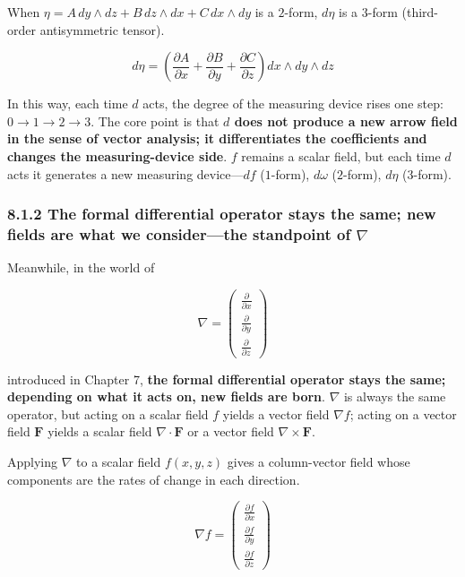\documentclass[a4paper,12pt,openany]{book}
\begin{document}
When \(\eta = A\,dy\wedge dz + B\,dz\wedge dx + C\,dx\wedge dy\) is a
\(2\)-form, \(d\eta\) is a \(3\)-form (third-order antisymmetric
tensor).

\[d\eta = \left(\frac{\partial A}{\partial x} + \frac{\partial B}{\partial y} + \frac{\partial C}{\partial z}\right) dx\wedge dy\wedge dz\]

In this way, each time \(d\) acts, the degree of the measuring device
rises one step: \(0\to1\to2\to3\). The core point is that
\textbf{$d$ does not produce a new arrow field in the sense of vector analysis; it differentiates the coefficients and changes the measuring-device side}.
\(f\) remains a scalar field, but each time \(d\) acts it generates a
new measuring device—\(df\) (\(1\)-form), \(d\omega\) (\(2\)-form),
\(d\eta\) (\(3\)-form).

\hypertarget{the-formal-differential-operator-stays-the-same-new-fields-are-what-we-considerthe-standpoint-of-nabla}{%
\subsubsection{\texorpdfstring{8.1.2 The formal differential operator
stays the same; new fields are what we consider—the standpoint of
\(\nabla\)}{8.1.2 The formal differential operator stays the same; new fields are what we consider—the standpoint of \textbackslash nabla}}\label{the-formal-differential-operator-stays-the-same-new-fields-are-what-we-considerthe-standpoint-of-nabla}}

Meanwhile, in the world of

\[
\nabla
=
\begin{pmatrix}
\frac{\partial}{\partial x}\\[0.3em]
\frac{\partial}{\partial y}\\[0.3em]
\frac{\partial}{\partial z}
\end{pmatrix}
\]

introduced in Chapter 7,
\textbf{the formal differential operator stays the same; depending on what it acts on, new fields are born}.
\(\nabla\) is always the same operator, but acting on a scalar field
\(f\) yields a vector field \(\nabla f\); acting on a vector field
\(\mathbf{F}\) yields a scalar field \(\nabla\cdot\mathbf{F}\) or a
vector field \(\nabla\times\mathbf{F}\).

Applying \(\nabla\) to a scalar field \(f(x,y,z)\) gives a column-vector
field whose components are the rates of change in each direction.

\[\nabla f = \begin{pmatrix} \frac{\partial f}{\partial x} \\[0.3em] \frac{\partial f}{\partial y} \\[0.3em] \frac{\partial f}{\partial z} \end{pmatrix}\]
\end{document}
